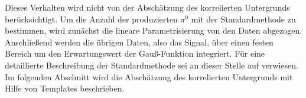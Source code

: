 Dieses Verhalten wird nicht von der Abschätzung des korrelierten Untergrunds berücksichtigt.
\newline
Um die Anzahl der produzierten $\pi^{0}$ mit der Standardmethode zu bestimmen, wird zunächst die lineare Parametrisierung von den Daten abgezogen.
Anschließend werden die übrigen Daten, also das Signal, über einen festen Bereich um den Erwartungswert der Gauß-Funktion integriert.
Für eine detaillierte Beschreibung der Standardmethode sei an dieser Stelle auf \cite{thesis:Adrian} verwiesen.
\newline
Im folgenden Abschnitt wird die Abschätzung des korrelierten Untergrunds mit Hilfe von Templates beschrieben.